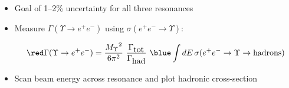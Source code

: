 \begin{slide*}
\slideframe{}
\begin{minipage}[t]{\linewidth}
\LARGE \black

\vspace{0.5 cm}
\begin{itemize}

  \item Goal of 1--2\% uncertainty for all three resonances

  \vspace{0.5 cm}
  \item Measure {\red $\Gamma(\Upsilon \to e^+e^-)$}
        using {\blue $\sigma(e^+e^- \to \Upsilon)$:}

\begin{center}
  \[ {\red \Gamma(\Upsilon \to e^+ e^-)} = \frac{\mbox{$M_\Upsilon$}^2}{6 \pi^2} \mbox{ }
     \frac{\Gamma_{\mbox{\normalsize tot}}}{\Gamma_{\mbox{\normalsize had}}} \mbox{ }
     {\blue \int dE\, \sigma(e^+ e^- \to \Upsilon \to \mbox{hadrons})}
  \]
\end{center}

  \vspace{0.5 cm}
  \item Scan beam energy across resonance and plot hadronic cross-section

\vspace{0.5 cm}
\begin{center}
\end{center}

\end{itemize}

\gray
\vspace{-1 cm}


  


\end{minipage}
\end{slide*}
